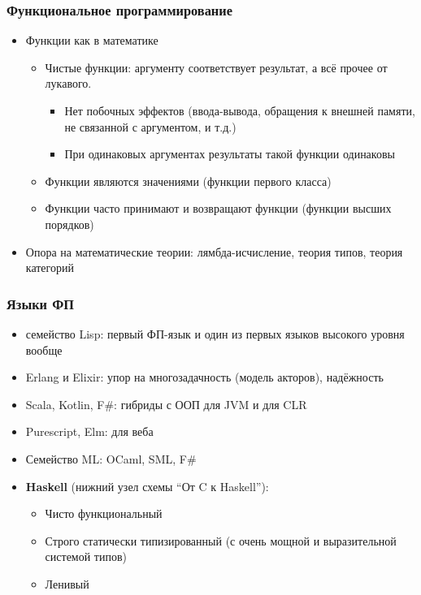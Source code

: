 \documentclass[10pt]{beamer}
\begin{document}
\begin{frame}
  \frametitle{Функциональное программирование}
  \begin{itemize}
    \item Функции как в математике\pause
          \begin{itemize}
            \item Чистые функции: аргументу соответствует результат, а всё прочее от лукавого.
                  \begin{itemize}
                    \item Нет побочных эффектов (ввода-вывода, обращения к внешней памяти, не связанной с аргументом, и т.д.)
                    \item При одинаковых аргументах результаты такой функции одинаковы
                  \end{itemize}
            \item Функции являются значениями (функции первого класса)
            \item Функции часто принимают и возвращают функции (функции высших порядков)
          \end{itemize}
          \pause
    \item Опора на математические теории: лямбда-исчисление, теория типов, теория категорий
  \end{itemize}
\end{frame}

\begin{frame}
  \frametitle{Языки ФП}
  \begin{itemize}
    \item семейство Lisp: первый ФП-язык и один из первых языков высокого уровня вообще
    \item Erlang и Elixir: упор на многозадачность (модель акторов), надёжность
    \item Scala, Kotlin, F\#: гибриды с ООП для JVM и для CLR
    \item Purescript, Elm: для веба
    \item Семейство ML: OCaml, SML, F\#
          \pause
    \item \textbf{Haskell} (нижний узел схемы \enquote{От C к Haskell}):
          \begin{itemize}
            \item Чисто функциональный
                  \pause
            \item Строго статически типизированный (с очень мощной и выразительной системой типов)
                  \pause
            \item Ленивый
          \end{itemize}
  \end{itemize}
\end{frame}
\end{document}
